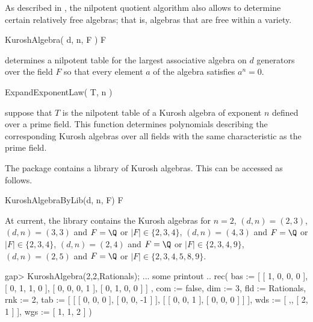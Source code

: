 
As described in \cite{Eic11}, the nilpotent quotient algorithm also allows
to determine certain relatively free algebras; that is, algebras that are
free within a variety.


\> KuroshAlgebra( d, n, F ) F

determines a nilpotent table for the largest associative algebra on
$d$ generators over the field $F$ so that every element $a$ of the 
algebra satisfies $a^n = 0$.

\> ExpandExponentLaw( T, n )

suppose that $T$ is the nilpotent table of a Kurosh algebra of exponent
$n$ defined over a prime field. This function determines polynomials 
describing the corresponding Kurosh algebras over all fields with the same 
characteristic as the prime field.


The package contains a library of Kurosh algebras. This can be accessed
as follows.

\> KuroshAlgebraByLib(d, n, F) F

At current, the library contains the Kurosh algebras for 
$n=2$, 
$(d,n) = (2,3)$, 
$(d,n) = (3,3)$ and $F = \Q$ or $|F| \in \{2,3,4\}$,
$(d,n) = (4,3)$ and $F = \Q$ or $|F| \in \{2,3,4\}$,
$(d,n) = (2,4)$ and $F = \Q$ or $|F| \in \{2,3,4,9\}$,
$(d,n) = (2,5)$ and $F = \Q$ or $|F| \in \{2,3,4,5,8,9\}$.


\beginexample
gap> KuroshAlgebra(2,2,Rationals);
... some printout ..
rec( bas := [ [ 1, 0, 0, 0 ], [ 0, 1, 1, 0 ], [ 0, 0, 0, 1 ], [ 0, 1, 0, 0 ] ]
    , com := false, dim := 3, fld := Rationals, rnk := 2, 
  tab := [ [ [ 0, 0, 0 ], [ 0, 0, -1 ] ], [ [ 0, 0, 1 ], [ 0, 0, 0 ] ] ], 
  wds := [ ,, [ 2, 1 ] ], wgs := [ 1, 1, 2 ] )
\endexample


